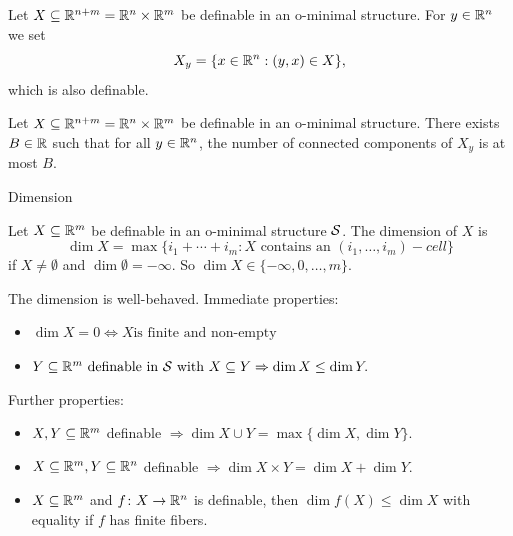 \documentclass{beamer}
\begin{document}
\begin{frame}
  \begin{minipage}{0.6\linewidth}
    \begin{lemma}
      Let $X\subseteq {\mathbb{R}}^{n+m}= {\mathbb{R}}^{n}\times
      {\mathbb{R}}^m$ be definable in an o-minimal structure. For $y\in{\mathbb{R}}^n$ we set
      \begin{equation*}
        X_y = \{ x\in{\mathbb{R}}^n : (y,x)\in X\},
      \end{equation*}
      which is also definable. 
    \end{lemma}
  \end{minipage}  \begin{minipage}{0.3\linewidth}
  \end{minipage}

  \begin{theorem}
    Let $X\subseteq {\mathbb{R}}^{n+m}= {\mathbb{R}}^{n}\times
    {\mathbb{R}}^m$ be definable in an o-minimal structure.
    There exists $B\in{\mathbb{R}}$ such that for all
    $y\in{\mathbb{R}}^n$, the number of
    connected components of $X_y$ is at most $B$.
  \end{theorem}  
\end{frame}

\begin{frame}{Dimension}
  \begin{definition}
    Let $X\subseteq{\mathbb{R}}^m$ be definable in an o-minimal
    structure ${\mathcal S}$. The
    \alert{dimension} of $X$ is
    \begin{equation*}
      \dim X = \max \{i_1+\cdots+i_m: X\text{ contains an
      }(i_1,\ldots,i_m)-cell\}
    \end{equation*}
    if $X\not=\emptyset$ and $\dim \emptyset=-\infty$. So $\dim X \in
    \{-\infty, 0,\ldots,m\}$. 
  \end{definition}

  \vspace{-0.2cm}
  The dimension is \alert{well-behaved}. Immediate properties:
  \begin{itemize}
    \vspace{-0.2cm}
  \item $\dim X = 0  \Leftrightarrow \text{$X$
      is finite and non-empty}$
  \item
        $\text{$Y\subseteq{\mathbb{R}}^m$ definable in ${\mathcal S}$ with  $X\subseteq Y$}
        \Rightarrow 
    \dim X\le \dim Y.$
  \end{itemize}
  \vspace{-0.2cm}
  Further properties:  
  \begin{itemize}
      \vspace{-0.2cm}
  \item $X,Y\subseteq{\mathbb{R}}^m$  definable $\Rightarrow \dim X\cup Y = \max\{\dim X,\dim Y\}$.
  \item $X\subseteq{\mathbb{R}}^m,Y\subseteq{\mathbb{R}}^n$  definable $\Rightarrow \dim
    X\times Y = \dim X +\dim Y$.
  \item $X\subseteq{\mathbb{R}}^m$ and $f\colon
    X\rightarrow{\mathbb{R}}^n$ is definable, then $\dim f(X) \le \dim X$ with
    equality if $f$ has finite fibers.
  \end{itemize}
\end{frame}
\end{document}
